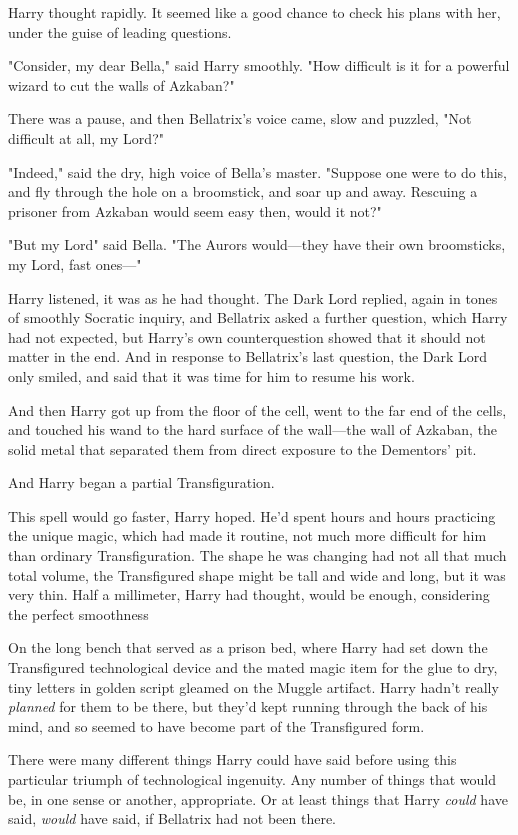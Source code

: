 Harry thought rapidly. It seemed like a good chance to check his plans with
her, under the guise of leading questions.

"Consider, my dear Bella," said Harry smoothly. "How difficult is it for a
powerful wizard to cut the walls of Azkaban?"

There was a pause, and then Bellatrix's voice came, slow and puzzled, "Not
difficult at all, my Lord{\el}?"

"Indeed," said the dry, high voice of Bella's master. "Suppose one were to do
this, and fly through the hole on a broomstick, and soar up and away. Rescuing
a prisoner from Azkaban would seem easy then, would it not?"

"But my Lord{\el}" said Bella. "The Aurors would—they have their own
broomsticks, my Lord, fast ones—"

Harry listened, it was as he had thought. The Dark Lord replied, again in tones
of smoothly Socratic inquiry, and Bellatrix asked a further question, which
Harry had not expected, but Harry's own counterquestion showed that it should
not matter in the end. And in response to Bellatrix's last question, the Dark
Lord only smiled, and said that it was time for him to resume his work.

And then Harry got up from the floor of the cell, went to the far end of the
cells, and touched his wand to the hard surface of the wall—the wall of
Azkaban, the solid metal that separated them from direct exposure to the
Dementors' pit.

And Harry began a partial Transfiguration.

This spell would go faster, Harry hoped. He'd spent hours and hours practicing
the unique magic, which had made it routine, not much more difficult for him
than ordinary Transfiguration. The shape he was changing had not all that much
total volume, the Transfigured shape might be tall and wide and long, but it
was very thin. Half a millimeter, Harry had thought, would be enough,
considering the perfect smoothness{\el}

On the long bench that served as a prison bed, where Harry had set down the
Transfigured technological device and the mated magic item for the glue to dry,
tiny letters in golden script gleamed on the Muggle artifact. Harry hadn't
really \emph{planned} for them to be there, but they'd kept running through the
back of his mind, and so seemed to have become part of the Transfigured form.

There were many different things Harry could have said before using this
particular triumph of technological ingenuity. Any number of things that would
be, in one sense or another, appropriate. Or at least things that Harry
\emph{could} have said, \emph{would} have said, if Bellatrix had not been there.

